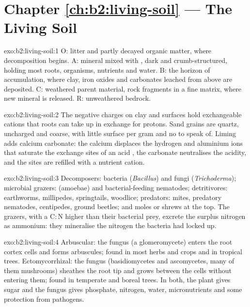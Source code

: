 \section*{Chapter \ref{ch:b2:living-soil} --- The Living Soil}

\begin{solution}{exo:b2:living-soil:1}
O: litter and partly decayed organic matter, where decomposition
begins. A: mineral  mixed with , dark and crumb-structured,
holding most roots, organisms, nutrients and water. B: the horizon
of accumulation, where clay, iron oxides and carbonates leached
from above are deposited. C: weathered parent material, rock
fragments in a fine matrix, where new mineral  is released. R:
unweathered bedrock.
\end{solution}

\begin{solution}{exo:b2:living-soil:2}
The negative charges on clay and  surfaces hold exchangeable
cations that roots can take up in exchange for protons. Sand grains
are quartz, uncharged and coarse, with little surface per gram
and no  to speak of. Liming adds calcium carbonate: the
calcium displaces the hydrogen and aluminium ions that saturate the
exchange sites of an acid , the carbonate neutralises the
acidity, and the sites are refilled with a nutrient cation.
\end{solution}

\begin{solution}{exo:b2:living-soil:3}
Decomposers: bacteria (\emph{Bacillus}) and fungi
(\emph{Trichoderma}); microbial grazers:  (amoebae) and
bacterial-feeding nematodes; detritivores: earthworms, millipedes,
springtails, woodlice; predators: mites, predatory nematodes,
centipedes, ground beetles; and moles or shrews at the top. The
grazers, with a $\mathrm{C:N}$ higher than their bacterial prey,
excrete the surplus nitrogen as ammonium: they mineralise the
nitrogen the bacteria had locked up.
\end{solution}

\begin{solution}{exo:b2:living-soil:4}
Arbuscular: the fungus (a glomeromycete) enters the root cortex
cells and forms arbuscules; found in most herbs and crops and in
tropical trees. Ectomycorrhizal: the fungus (basidiomycetes and
ascomycetes, many of them mushrooms) sheathes the root tip and
grows between the cells without entering them; found in temperate
and boreal trees. In both, the plant gives sugar and the fungus
gives phosphate, nitrogen, water, micronutrients and some
protection from pathogens.
\end{solution}

